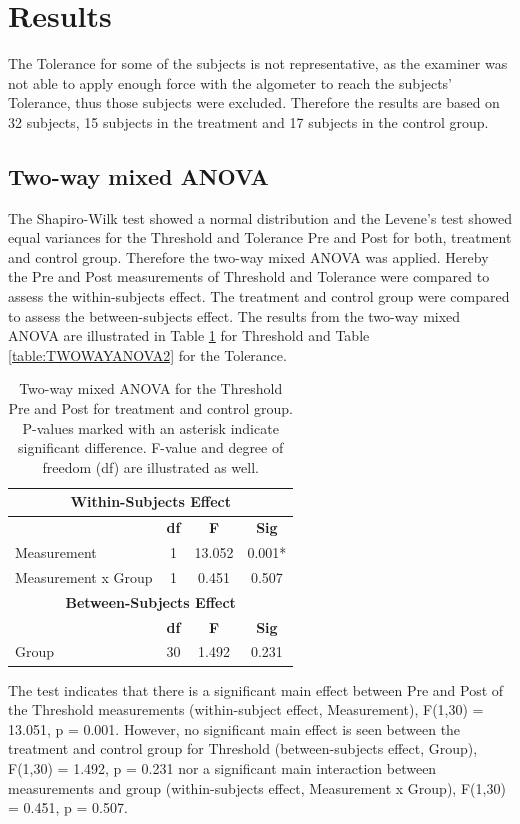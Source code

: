 \section{Results}
The Tolerance for some of the subjects is not representative, as the examiner was not able to apply enough force with the algometer to reach the subjects' Tolerance, thus those subjects were excluded. 
Therefore the results are based on 32 subjects, 15 subjects in the treatment and 17 subjects in the control group. 

\subsection{Two-way mixed ANOVA}
The Shapiro-Wilk test showed a normal distribution and the Levene's test showed equal variances for the Threshold and Tolerance Pre and Post for both, treatment and control group. Therefore the two-way mixed ANOVA was applied. Hereby the Pre and Post measurements of Threshold and Tolerance were compared to assess the within-subjects effect. The treatment and control group were compared to assess the between-subjects effect. The results from the two-way mixed ANOVA are illustrated in Table \ref{table:TWOWAYANOVA1} for Threshold and Table \ref{table:TWOWAYANOVA2} for the Tolerance. 

\begin{table}[ht]
\caption{Two-way mixed ANOVA for the Threshold Pre and Post for treatment and control group. P-values marked with an asterisk indicate significant difference. F-value and degree of freedom (df) are illustrated as well.}
\centering
\begin{tabular}{l c c c}
\toprule
\multicolumn{4}{c}{\textbf{Within-Subjects Effect}} \\
\midrule
& \textbf{df} &\textbf{F} & \textbf{Sig} \\ [0.5ex] %
Measurement & 1 & 13.052 &  0.001* \\
Measurement x Group & 1 & 0.451 & 0.507 \\
\toprule
\multicolumn{4}{c}{\textbf{Between-Subjects Effect}} \\
\midrule 
& \textbf{df} & \textbf{F} & \textbf{Sig} \\ [0.5ex] %
Group & 30 & 1.492 &  0.231 \\
\hline
\end{tabular}
\label{table:TWOWAYANOVA1}
\end{table}

The test indicates that there is a significant main effect between Pre and Post of the Threshold measurements (within-subject effect, Measurement), F(1,30) = 13.051, p = 0.001. However, no significant main effect is seen between the treatment and control group for Threshold (between-subjects effect, Group), F(1,30) = 1.492, p = 0.231 nor a significant main interaction between measurements and group (within-subjects effect, Measurement x Group), F(1,30) = 0.451, p = 0.507. 

